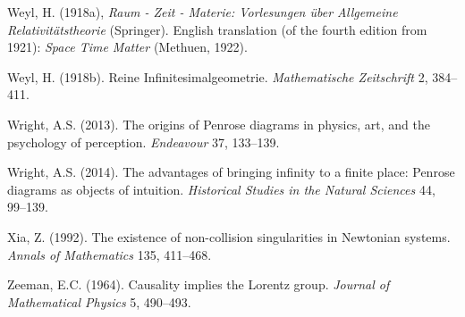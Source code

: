 \documentclass[11pt,a4paper]{article}
\begin{document}
\begin{small}
\begin{thebibliography}{99}
   \item[] Weyl, H. (1918a), \emph{Raum - Zeit - Materie: Vorlesungen \"{u}ber Allgemeine Relativit\"{a}tstheorie}
  (Springer). English translation (of the fourth edition from 1921): \emph{Space Time Matter} (Methuen, 1922). 
    \item[] Weyl, H. (1918b). Reine Infinitesimalgeometrie. \emph{Mathematische Zeitschrift} 2, 384--411.  
     \item[]  Wright, A.S. (2013). The origins of Penrose diagrams in physics, art, and the psychology of perception.
   \emph{Endeavour} 37, 133--139.
  \item[]  Wright, A.S. (2014). The advantages of bringing infinity to a finite place: Penrose diagrams as objects of intuition.
  \emph{ Historical Studies in the Natural Sciences} 44, 99--139.
  \item[] Xia, Z.  (1992). The existence of non-collision singularities
in Newtonian systems. \emph{Annals of Mathematics} 135, 411--468. 
    \item[] Zeeman, E.C. (1964). Causality implies the Lorentz group. \emph{Journal of Mathematical Physics} 5, 490--493.
\end{thebibliography}
\end{small}
\end{document}
